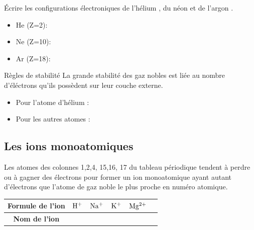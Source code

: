 \documentclass[french]{article}
\begin{document}
\begin{Exercice}{Écrire les configurations électroniques de l'hélium , du néon  et de l'argon }.\smallskip

\begin{itemize}
	\item He (Z=2): \dotfill\bigskip %
	\item Ne (Z=10): \dotfill\bigskip%
	\item Ar (Z=18): \dotfill\bigskip%
\end{itemize} 
\end{Exercice}
\begin{definition}{Règles de stabilité}
	La grande stabilité des gaz nobles est liée au nombre d'éléctrons qu'ils possèdent sur leur couche externe. 
\begin{itemize}
	\item Pour l'atome d'hélium : \dotfill\medskip%
	\item Pour les autres atomes : \dotfill\medskip%
\end{itemize}
\end{definition}

\subsection{Les ions monoatomiques}

Les atomes des colonnes 1,2,4, 15,16, 17 du tableau périodique tendent à perdre ou à gagner des électrons pour former un ion monoatomique ayant autant d'électrons que l'atome de gaz noble le plus proche en numéro atomique.


\begin{table}[ht]
	\centering
	\begin{tabular}{|c|c|c|c|c|c|}
		\hline 
		\textbf{Formule de l'ion} & $\rm H^+$ & $\rm Na^+$ & $\rm K^+$ & $\rm Mg^{2+}$ \\ \hline
		\textbf{Nom de l'ion} &  &  &  & \\ \hline 
	\end{tabular}
\end{table}
\end{document}
